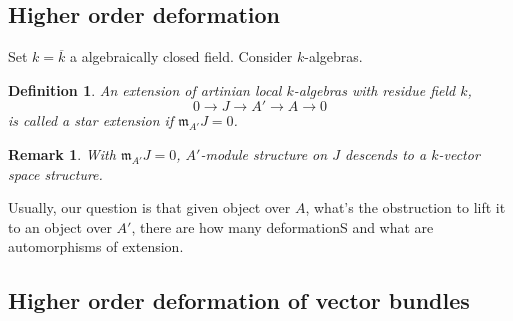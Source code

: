 \documentclass{ctexart}
\newtheorem{definition}{Definition}[section]
\newtheorem{remark}{Remark}[section]
\begin{document}
\subsection{Higher order deformation}
\label{subsection:Obstruction_Theory_higher_order_deformation}

Set $k = \overline{k}$ a algebraically closed field.
Consider $k$-algebras.
\begin{definition}
    An extension of artinian local $k$-algebras with residue field $k$,
    \begin{equation}
        0 \longrightarrow J \longrightarrow A' \longrightarrow A \longrightarrow 0
    \end{equation}
    is called a star extension if $\mathfrak{m}_{A'}J = 0$.
\end{definition}
\begin{remark}
    With $\mathfrak{m}_{A'}J = 0$, $A'$-module structure on $J$ descends to a $k$-vector space structure.
\end{remark}
Usually, our question is that given object over $A$, 
what's the obstruction to lift it to an object over $A'$,
there are how many deformationS and what are automorphisms of extension.

\subsection{Higher order deformation of vector bundles}
\label{subsection:Obstruction_Theory_higher_order_deformation_of_vector_bundles}
\end{document}
